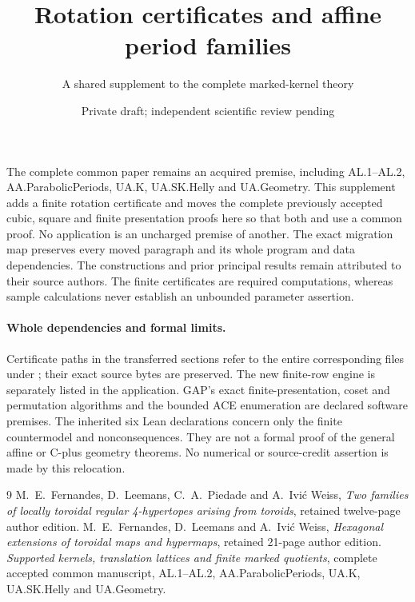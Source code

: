 \documentclass[11pt,a4paper]{article}
\title{Rotation certificates and affine period families}
\author{A shared supplement to the complete marked-kernel theory}
\date{Private draft; independent scientific review pending}
\begin{document}
\maketitle
The complete common paper \cite{common} remains an acquired premise, including
AL.1--AL.2, AA.ParabolicPeriods, UA.K, UA.SK.Helly and UA.Geometry.
This supplement adds a finite rotation certificate and moves the complete
previously accepted cubic, square and finite presentation proofs here so that
both \cite{source} and \cite{earlier} use a common proof. No application is
an uncharged premise of another. The exact migration map preserves every
moved paragraph and its whole program and data dependencies.
The constructions and prior principal results remain attributed to their
source authors. The finite certificates are required computations, whereas
sample calculations never establish an unbounded parameter assertion.







\paragraph{Whole dependencies and formal limits.}
Certificate paths in the transferred sections refer to the entire corresponding
files under ; their exact source bytes are preserved.
The new finite-row engine is separately listed in the application.
GAP's exact finite-presentation, coset and permutation algorithms and the
bounded ACE enumeration are declared software premises. The inherited six
Lean declarations concern only the finite countermodel and nonconsequences.
They are not a formal proof of the general affine or C-plus geometry theorems.
No numerical or source-credit assertion is made by this relocation.
\begin{thebibliography}{9}
 M.~E.~Fernandes, D.~Leemans, C.~A.~Piedade and
A.~Ivi\'c Weiss, \emph{Two families of locally toroidal regular
4-hypertopes arising from toroids}, retained twelve-page author edition.
 M.~E.~Fernandes, D.~Leemans and A.~Ivi\'c Weiss,
\emph{Hexagonal extensions of toroidal maps and hypermaps}, retained
21-page author edition.
 \emph{Supported kernels, translation lattices and finite
marked quotients}, complete accepted common manuscript, AL.1--AL.2,
AA.ParabolicPeriods, UA.K, UA.SK.Helly and UA.Geometry.
\end{thebibliography}
\end{document}
